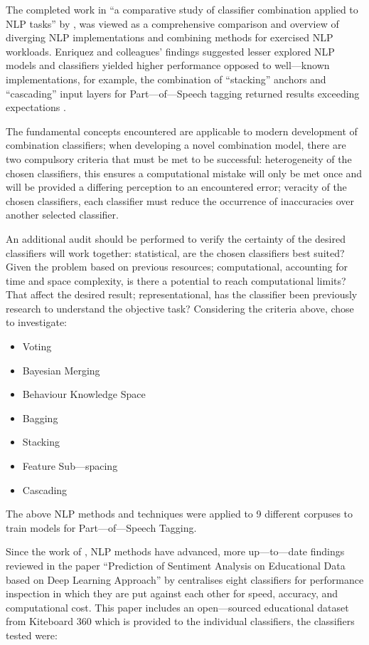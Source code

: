 The completed work in “a comparative study of classifier combination applied to NLP tasks” by \textcite{enriquez2013comparative}, was viewed as a comprehensive comparison and overview of diverging NLP implementations and combining methods for exercised NLP workloads. Enriquez and colleagues’ findings suggested lesser explored NLP models and classifiers yielded higher performance opposed to well---known implementations, for example, the combination of “stacking” anchors and “cascading” input layers for Part---of---Speech tagging returned results exceeding expectations \parencite{enriquez2013comparative}.

The fundamental concepts \textcite{enriquez2013comparative} encountered are applicable to modern development of combination classifiers; when developing a novel combination model, there are two compulsory criteria that must be met to be successful: heterogeneity of the chosen classifiers, this ensures a computational mistake will only be met once and will be provided a differing perception to an encountered error; veracity of the chosen classifiers, each classifier must reduce the occurrence of inaccuracies over another selected classifier.

An additional audit should be performed to verify the certainty of the desired classifiers will work together: statistical, are the chosen classifiers best suited? Given the problem based on previous resources; computational, accounting for time and space complexity, is there a potential to reach computational limits? That affect the desired result; representational, has the classifier been previously research to understand the objective task? Considering the criteria above, \textcite{enriquez2013comparative} chose to investigate:

\begin{itemize}
    \item Voting
    \item Bayesian Merging
    \item Behaviour Knowledge Space
    \item Bagging
    \item Stacking
    \item Feature Sub---spacing
    \item Cascading
\end{itemize}

The above NLP methods and techniques were applied to 9 different corpuses to train models for Part---of---Speech Tagging.

Since the work of \textcite{enriquez2013comparative}, NLP methods have advanced, more up---to---date findings reviewed in the paper “Prediction of Sentiment Analysis on Educational Data based on Deep Learning Approach” by \parencite{sultana2018prediction} centralises eight classifiers for performance inspection in which they are put against each other for speed, accuracy, and computational cost. This paper includes an open---sourced educational dataset from Kiteboard 360 which is provided to the individual classifiers, the classifiers tested were:


